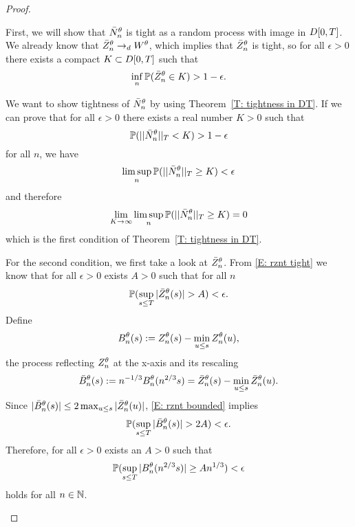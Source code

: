 \begin{proof}
\begin{proofpart}
First, we will show that $\bar{N}_n^{\theta}$ is tight as a random process with image in $D[0, T]$.
We already know that $\bar{Z}^{\theta}_n \rightarrow_d W^{\theta}$, which implies that $\bar{Z}^{\theta}_n$ is tight, 
so for all $\epsilon>0$ there exists a compact $K \subset D[0, T]$ such that
\begin{equation} \label{E: rznt tight}
\inf_n \mathbb{P} ( \bar{Z}^{\theta}_n \in K) > 1 - \epsilon.
\end{equation}

We want to show tightness of $\bar{N}_n^{\theta}$ by using Theorem~\ref{T: tightness in DT}.
If we can prove that for all $\epsilon > 0$ there exists a real number $K > 0$ such that
\begin{equation}
	\mathbb{P}(||\bar{N}_n^{\theta}||_T < K) > 1 - \epsilon
\end{equation}
for all $n$, we have
\begin{equation}
	\limsup_n \mathbb{P}(||\bar{N}_n^{\theta}||_T \geq K) < \epsilon
\end{equation}
and therefore
\begin{equation}
	\lim_{K \rightarrow \infty} \limsup_n \mathbb{P}(||\bar{N}_n^{\theta}||_T \geq K) = 0
\end{equation}
which is the first condition of Theorem~\ref{T: tightness in DT}.

For the second condition, we first take a look at $\bar{Z}^{\theta}_n$.
From \eqref{E: rznt tight} we know that for all $\epsilon > 0$ exists $A>0$ such that for all $n$
\begin{equation} \label{E: rznt bounded}
\mathbb{P}(\sup_{s \leq T} |\bar{Z}^{\theta}_n(s)| > A) < \epsilon.
\end{equation}
Define 
\begin{equation}
	B_n^{\theta}(s) := Z_n^{\theta}(s) - \min_{u \leq s}Z_n^{\theta}(u),
\end{equation}
the process reflecting $Z_n^{\theta}$ at the x-axis and its rescaling
\begin{equation}
	\bar{B}_n^{\theta}(s) := n^{-1 / 3}B_n^{\theta}(n^{2 / 3}s) = \bar{Z}^{\theta}_n(s) - \min_{u \leq s}\bar{Z}^{\theta}_n(u).
\end{equation}
Since $|\bar{B}_n^{\theta}(s)| \leq 2\max_{u \leq s}|\bar{Z}^{\theta}_n(u)|$, \eqref{E: rznt bounded} implies
\begin{equation} \label{E: rzminz bounded}
\mathbb{P}(\sup_{s \leq T} |\bar{B}_n^{\theta}(s)| > 2A) < \epsilon.
\end{equation}
Therefore, for all $\epsilon > 0$ exists an $A>0$ such that
\begin{equation}
\mathbb{P}( \sup_{s \leq T} |B_n^{\theta}(n^{2 / 3}s)| \geq An^{1 / 3} ) < \epsilon
\end{equation}
holds for all $n \in \mathbb{N}$.


\end{proofpart}
\end{proof}
